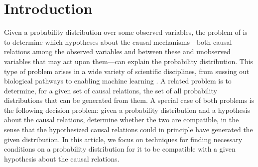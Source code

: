 \maketitle
\tableofcontents


\section{Introduction}

Given a probability distribution over some observed variables, the problem of  is to determine which hypotheses about the causal mechanisms---both causal relations among the observed variables and between these and unobserved variables that may act upon them---can explain the probability distribution.
 This type of problem arises in a wide variety of scientific disciplines, from sussing out biological pathways to enabling machine learning \cite{pearl2009causality,spirtes2011causation,studeny2005probabilistic,koller2009probabilistic}. A related problem is to determine, for a given set of causal relations, the set of all probability distributions that can be generated from them.   
A special case of both problems is the following decision problem: given a probability distribution and a hypothesis about the causal relations,  determine whether the two are compatible, in the sense that the hypothesized causal relations could in principle have generated the given distribution. 
In this article, we focus on techniques for 
finding necessary conditions on a probability distribution for it to be compatible with a given hypothesis about the causal relations.

